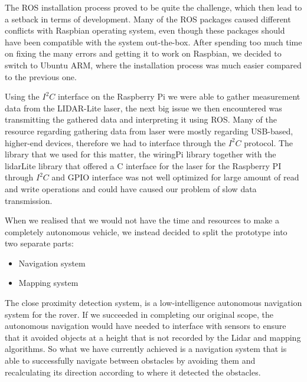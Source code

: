 The ROS installation process proved to be quite the challenge, which then lead to a setback in terms of development. Many of the ROS packages caused different conflicts with Raspbian operating system, even though these packages should have been compatible with the system out-the-box. After spending too much time on fixing the many errors and getting it to work on Raspbian, we decided to switch to Ubuntu ARM, where the installation process was much easier compared to the previous one.

Using the $I^2C$ interface on the Raspberry Pi we were able to gather measurement data from the LIDAR-Lite laser, the next big issue we then encountered was transmitting the gathered data and interpreting it using ROS. Many of the resource regarding gathering data from laser were mostly regarding USB-based, higher-end devices, therefore we had to interface through the $I^2C$ protocol. The library that we used for this matter, the wiringPi library together with the lidarLite library that offered a C interface for the laser for the Raspberry PI through $I^2C$ and GPIO interface was not well optimized for large amount of read and write operations and could have caused our problem of slow data transmission.

When we realised that we would not have the time and resources to make a completely autonomous vehicle, we instead decided to split the prototype into two separate parts: 
\begin{itemize}
	\item Navigation system
	\item Mapping system
\end{itemize}


The close proximity detection system, is a low-intelligence autonomous navigation system for the rover. If we succeeded in completing our original scope, the autonomous navigation would have needed to interface with sensors to ensure that it avoided objects at a height that is not recorded by the Lidar and mapping algorithms. So what we have currently achieved is a navigation system that is able to successfully navigate between obstacles by avoiding them and recalculating its direction according to where it detected the obstacles.\\


